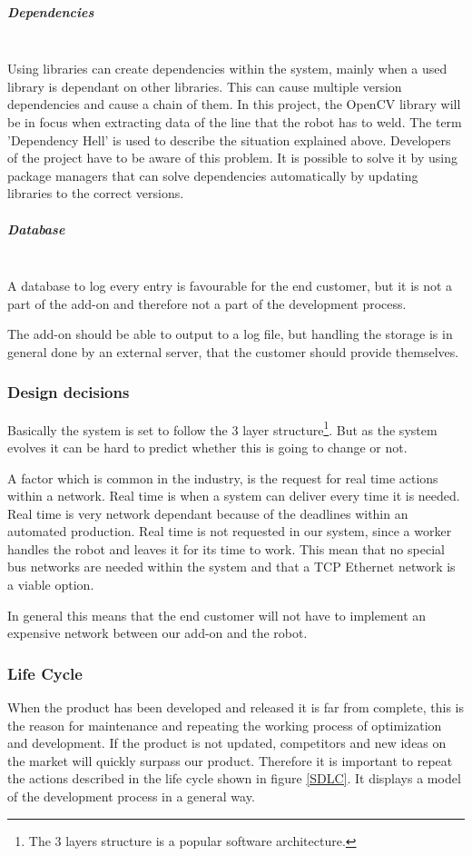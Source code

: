 \subparagraph*{Dependencies}~\\
Using libraries can create dependencies within the system, mainly when a used library is dependant on other libraries. This can cause multiple version dependencies and cause a chain of them. In this project, the OpenCV library will be in focus when extracting data of the line that the robot has to weld. 
The term 'Dependency Hell' is used to describe the situation explained above. 
Developers of the project have to be aware of this problem. It is possible to solve it by using package managers that can solve dependencies automatically by updating libraries to the correct versions. 

\subparagraph*{Database}~\\
A database to log every entry is favourable for the end customer, but it is not a part of the add-on and therefore not a part of the development process.

The add-on should be able to output to a log file, but handling the storage is in general done by an external server, that the customer should provide themselves.

\subsubsection{Design decisions}
Basically the system is set to follow the 3 layer structure\footnote{The 3 layers structure is a popular software architecture.}.
But as the system evolves it can be hard to predict whether this is going to change or not. 

A factor which is common in the industry, is the request for real time actions within a network. Real time is when a system can deliver every time it is needed. Real time is very network dependant because of the deadlines within an automated production. 
Real time is not requested in our system, since a worker handles the robot and leaves it for its time to work. This mean that no special bus networks are needed within the system and that a TCP Ethernet network is a viable option. 

In general this means that the end customer will not have to implement an expensive network between our add-on and the robot. 

\clearpage
\subsubsection{Life Cycle}

When the product has been developed and released it is far from complete, this is the reason for maintenance and repeating the working process of optimization and development. If the product is not updated, competitors and new ideas on the market will quickly surpass our product. Therefore it is important to repeat the actions described in the life cycle shown in figure \ref{SDLC}. 
It displays a model of the development process in a general way.


